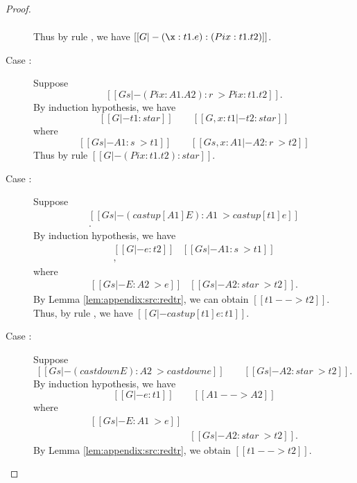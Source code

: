\begin{proof}
\begin{description}
\[\begin{array}{ll}
            \end{array}
            \]
            Thus by rule , we have $[[G |- (\x:t1.e):(Pi x:t1.t2)]]$.
        \item[Case \ruleref{TR\_Pi}:] Suppose 
                \[ [[Gs |- (Pi x:A1.A2):r ~> Pi x:t1.t2]]. \] 
            By induction hypothesis, we have 
            \[
                [[G |- t1 : star]] \qquad [[G, x : t1 |- t2 : star]]
            \]
            where
            \[
                [[Gs |- A1 : s ~> t1]] \qquad [[Gs, x: A1 |- A2 : r ~> t2]]
            \]
            Thus by rule  $[[G |- (Pi x:t1.t2) : star]]$.
        \item[Case \ruleref{TR\_CastUp}:] Suppose 
            \[\begin{array}{l}
                [[Gs |- (castup[A1] E):A1 ~> castup[t1] e]] \\
                [[Gs |- A1 : star ~> t1]].
            \end{array}\]
            By induction hypothesis, we have 
                \[
                \begin{array}{ll}
                [[G |- e : t2]] &
                [[Gs |- A1 : s ~> t1]] \\
                [[A1 --> A2]], &
                \end{array}
                \]
            where 
                \[
                \begin{array}{ll}
                [[Gs |- E : A2 ~> e]] &
                [[Gs |- A2 : star ~> t2]].
                \end{array}
                \]
            By Lemma \ref{lem:appendix:src:redtr}, we can obtain $[[t1 --> t2]]$. Thus, by rule
            , we have $[[G |- castup[t1] e : t1]]$.
        \item[Case \ruleref{TR\_CastDown}:] Suppose 
                \[ [[Gs |- (castdown E) : A2 ~> castdown e]] \qquad
                [[Gs |- A2 : star ~> t2]]. \]
            By induction hypothesis, we have 
                \[
                    [[G |- e : t1]] \qquad
                    [[A1 --> A2]]
                \]
            where
                \[
                \begin{array}{ll}
                [[Gs |- E : A1 ~> e]] & \\
                [[Gs |- A1 : star ~> t1]] &
                [[Gs |- A2 : star ~> t2]].
                \end{array}
                \]
            By Lemma \ref{lem:appendix:src:redtr}, we obtain $[[t1 --> t2]]$. 

\end{description}
\end{proof}
